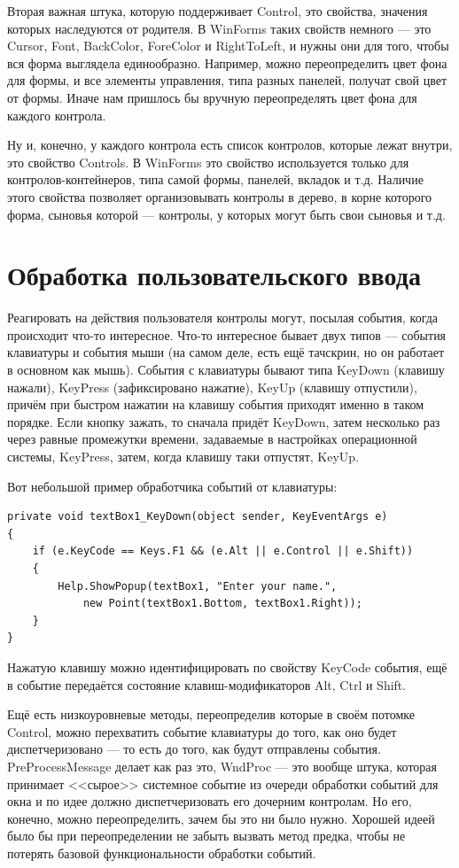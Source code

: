 \documentclass{../../text-style}
\begin{document}
Вторая важная штука, которую поддерживает Control, это свойства, значения которых наследуются от родителя. В WinForms таких свойств немного --- это Cursor, Font, BackColor, ForeColor и RightToLeft, и нужны они для того, чтобы вся форма выглядела единообразно. Например, можно переопределить цвет фона для формы, и все элементы управления, типа разных панелей, получат свой цвет от формы. Иначе нам пришлось бы вручную переопределять цвет фона для каждого контрола.

Ну и, конечно, у каждого контрола есть список контролов, которые лежат внутри, это свойство Controls. В WinForms это свойство используется только для контролов-контейнеров, типа самой формы, панелей, вкладок и т.д. Наличие этого свойства позволяет организовывать контролы в дерево, в корне которого форма, сыновья которой --- контролы, у которых могут быть свои сыновья и т.д.

\section{Обработка пользовательского ввода}

Реагировать на действия пользователя контролы могут, посылая события, когда происходит что-то интересное. Что-то интересное бывает двух типов --- события клавиатуры и события мыши (на самом деле, есть ещё тачскрин, но он работает в основном как мышь). События с клавиатуры бывают типа KeyDown (клавишу нажали), KeyPress (зафиксировано нажатие), KeyUp (клавишу отпустили), причём при быстром нажатии на клавишу события приходят именно в таком порядке. Если кнопку зажать, то сначала придёт KeyDown, затем несколько раз через равные промежутки времени, задаваемые в настройках операционной системы, KeyPress, затем, когда клавишу таки отпустят, KeyUp. 

Вот небольшой пример обработчика событий от клавиатуры: 

\begin{verbatim}
private void textBox1_KeyDown(object sender, KeyEventArgs e)
{
    if (e.KeyCode == Keys.F1 && (e.Alt || e.Control || e.Shift))
    {
        Help.ShowPopup(textBox1, "Enter your name.", 
            new Point(textBox1.Bottom, textBox1.Right));
    }
}
\end{verbatim}

Нажатую клавишу можно идентифицировать по свойству KeyCode события, ещё в событие передаётся состояние клавиш-модификаторов Alt, Ctrl и Shift. 

Ещё есть низкоуровневые методы, переопределив которые в своём потомке Control, можно перехватить событие клавиатуры до того, как оно будет диспетчеризовано --- то есть до того, как будут отправлены события. PreProcessMessage делает как раз это, WndProc --- это вообще штука, которая принимает <<сырое>> системное событие из очереди обработки событий для окна и по идее должно диспетчеризовать его дочерним контролам. Но его, конечно, можно переопределить, зачем бы это ни было нужно. Хорошей идеей было бы при переопределении не забыть вызвать метод предка, чтобы не потерять базовой функциональности обработки событий.
\end{document}
